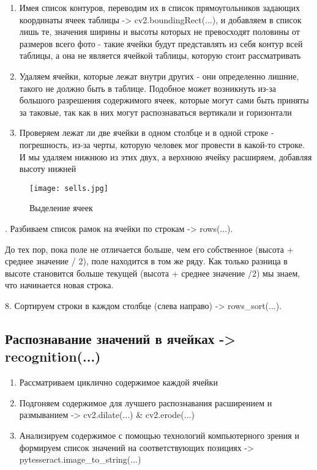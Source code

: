 \documentclass[a4paper, 12pt]{report}
\begin{document}
\begin{enumerate}
\begin{enumerate}
    \item Имея список контуров, переводим их в список прямоугольников задающих координаты ячеек таблицы -> cv2.boundingRect(...), и добавляем в список лишь те, значения ширины и высоты которых не превосходят половины от размеров всего фото - такие ячейки будут представлять из себя контур всей таблицы, а она не является ячейкой таблицы, которую стоит рассматривать 
    \item Удаляем ячейки, которые лежат внутри других - они определенно лишние, такого не должно быть в таблице. Подобное может возникнуть из-за большого разрешения содержимого ячеек, которые могут сами быть приняты за таковые, так как в них могут распознаваться вертикали и горизонтали
    \item Проверяем лежат ли две ячейки в одном столбце и в одной строке - погрешность, из-за черты, которую человек мог провести в какой-то строке. И мы удаляем нижнюю из этих двух, а верхнюю ячейку расширяем, добавляя высоту нижней
\end{enumerate}
\end{enumerate}

\begin{figure}[ht]
    \centering
    \texttt{[image: sells.jpg]}
    \caption{Выделение ячеек}
    \label{fig:my_label}
\end{figure}

.	Разбиваем список рамок на ячейки по строкам -> rows(...).

До тех пор, пока поле не отличается больше, чем его собственное (высота + среднее значение / 2), поле находится в том же ряду. Как только разница в высоте становится больше текущей (высота + среднее значение /2) мы знаем, что начинается новая строка.

8.	Сортируем строки в каждом столбце (слева направо) -> rows\_sort(...).

\subsection*{Распознавание значений в ячейках -> recognition(...)}

\begin{enumerate}
    \item Рассматриваем циклично содержимое каждой ячейки
    \item Подгоняем содержимое для лучшего распознавания расширением и размыванием -> cv2.dilate(...) & cv2.erode(...)
    \item Анализируем содержимое с помощью технологий компьютерного зрения и формируем список значений на соответствующих позициях -> pytesseract.image\_to\_string(...)
\end{enumerate}
\end{document}
